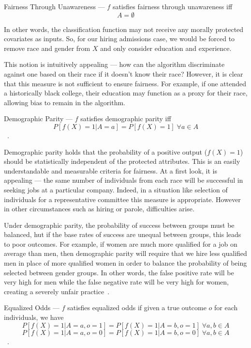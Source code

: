 \begin{definition}
    Fairness Through Unawareness — $f$ satisfies fairness through unawareness iff
    \[A = \emptyset\]
\end{definition}

In other words, the classification function may not receive any morally
protected covariates as inputs. So, for our hiring admissions case, we would be
forced to remove race and gender from $X$ and only consider education and
experience.

This notion is intuitively appealing — how can the algorithm discriminate
against one based on their race if it doesn't know their race? However, it is
clear that this measure is not sufficient to ensure fairness. For example, if
one attended a historically black college, their education may function as a
proxy for their race, allowing bias to remain in the algorithm.

\begin{definition}
    Demographic Parity — $f$ satisfies demographic parity iff
    \[P[f(X) = 1 | A = a] = P[f(X) = 1]\;\forall a \in A\]~\citep{Dwork_2012}.
\end{definition}

Demographic parity holds that the probability of a positive output ($f(X) = 1$)
should be statistically independent of the protected attributes. This is 
an easily understandable and measurable criteria for fairness. At a first look,
it is appealing — the same number of individuals from each race will be
successful in seeking jobs at a particular company. Indeed, in a situation like
selection of individuals for a representative committee this measure is
appropriate. However in other circumstances such as hiring or parole,
difficulties arise.

Under demographic parity, the probability of success between
groups must be balanced, hut if the base rates of success are unequal between
groups, this leads to poor outcomes. For example, if women are much more
qualified for a job on average than men, then demographic parity will require
that we hire less qualified men in place of more qualified women in order to
balance the probability of being selected between gender groups. In other words,
the false positive rate will be very high for men while the false negative rate
will be very high for women, creating a severely unfair
practice~\citep{Barocas_2017}.

\begin{definition}
    Equalized Odds — $f$ satisfies equalized odds if given a true outcome $o$
    for each individuals, we have
    \[P[f(X)=1|A=a, o=1] = P[f(X)=1|A=b, o=1]\;\forall a, b\in A\]
    \[P[f(X)=1|A=a, o=0] = P[f(X)=1|A=b, o=0]\;\forall a, b\in A\]~\citep{Hardt_2016}.
\end{definition}

